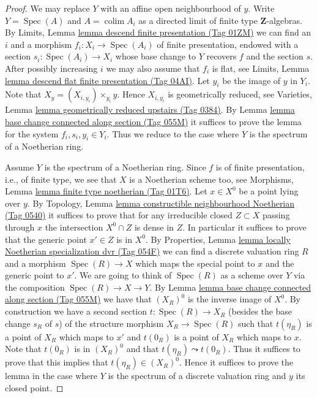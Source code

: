 \documentclass{amsart}
\theoremstyle{plain}
\theoremstyle{definition}
\theoremstyle{remark}
\numberwithin{equation}{subsection}
\def\colim{\mathop{\mathrm{colim}}\nolimits}
\def\Spec{\mathop{\mathrm{Spec}}}
\begin{document}
\begin{proof}
We may replace $Y$ with an affine open neighbourhood of $y$.
Write $Y = \Spec(A)$ and $A = \colim A_i$ as a directed
limit of finite type $\mathbf{Z}$-algebras. By
Limits, Lemma \href{https://stacks.math.columbia.edu/tag/01ZM}{lemma descend finite presentation (Tag 01ZM)}
we can find an $i$ and a morphism $f_i : X_i \to \Spec(A_i)$ of
finite presentation, endowed with a section $s_i : \Spec(A_i) \to X_i$
whose base change to $Y$ recovers $f$ and the section $s$.
After possibly increasing $i$ we may also assume that $f_i$ is flat, see
Limits, Lemma \href{https://stacks.math.columbia.edu/tag/04AI}{lemma descend flat finite presentation (Tag 04AI)}.
Let $y_i$ be the image of $y$ in $Y_i$. Note that
$X_y = (X_{i, y_i}) \times_{y_i} y$. Hence $X_{i, y_i}$ is geometrically
reduced, see
Varieties, Lemma \href{https://stacks.math.columbia.edu/tag/0384}{lemma geometrically reduced upstairs (Tag 0384)}.
By
Lemma \href{https://stacks.math.columbia.edu/tag/055M}{lemma base change connected along section (Tag 055M)}
it suffices to prove the lemma for the system $f_i, s_i, y_i \in Y_i$.
Thus we reduce to the case where $Y$ is the spectrum of a Noetherian ring.

\medskip\noindent
Assume $Y$ is the spectrum of a Noetherian ring.
Since $f$ is of finite presentation,
i.e., of finite type, we see that $X$ is a Noetherian scheme too, see
Morphisms, Lemma \href{https://stacks.math.columbia.edu/tag/01T6}{lemma finite type noetherian (Tag 01T6)}.
Let $x \in X^0$ be a point lying over $y$. By
Topology, Lemma \href{https://stacks.math.columbia.edu/tag/0540}{lemma constructible neighbourhood Noetherian (Tag 0540)}
it suffices to prove that for any irreducible closed $Z \subset X$
passing through $x$ the intersection $X^0 \cap Z$ is dense in $Z$.
In particular it suffices to prove that the generic point $x' \in Z$
is in $X^0$. By
Properties, Lemma \href{https://stacks.math.columbia.edu/tag/054F}{lemma locally Noetherian specialization dvr (Tag 054F)}
we can find a discrete valuation ring $R$ and a morphism
$\Spec(R) \to X$ which maps the special point to $x$ and
the generic point to $x'$. We are going to think of $\Spec(R)$
as a scheme over $Y$ via the composition $\Spec(R) \to X \to Y$. By
Lemma \href{https://stacks.math.columbia.edu/tag/055M}{lemma base change connected along section (Tag 055M)}
we have that $(X_R)^0$ is the inverse image of $X^0$.
By construction we have a second section $t : \Spec(R) \to X_R$
(besides the base change $s_R$ of $s$)
of the structure morphism $X_R \to \Spec(R)$ such that
$t(\eta_R)$ is a point of $X_R$ which maps to $x'$ and
$t(0_R)$ is a point of $X_R$ which maps to $x$. Note that
$t(0_R)$ is in $(X_R)^0$ and that $t(\eta_R) \leadsto t(0_R)$.
Thus it suffices to prove that this implies that $t(\eta_R) \in (X_R)^0$.
Hence it suffices to prove the lemma in the case where $Y$
is the spectrum of a discrete valuation ring and $y$ its closed point.


\end{proof}
\end{document}
